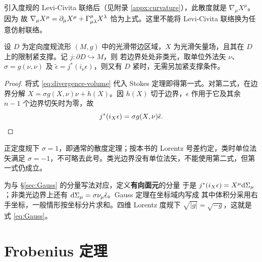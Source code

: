 \begin{remark}
    引入度规的 Levi-Civita 联络后（见附录 \ref{appx:curvature}），此散度就是 $\nabla_\mu X^\mu$。因为
    故 $\nabla_\mu X^\mu=\partial_\mu X^\mu+\Gamma^\mu_{\mu\lambda}X^\lambda$ 恰为上式。这里不能将 Levi-Civita 联络换为任意仿射联络。
\end{remark}

\begin{theorem}[Gauss]
    设 $D$ 为定向度规流形 $(M,g)$ 中的光滑带边区域，$X$ 为光滑矢量场，且其在 $D$ 上的限制紧支撑。记 $j:\partial D\hookrightarrow M$，则
    若边界处处非类光，取单位外法矢 $\nu$、$\sigma=g(\nu,\nu)$ 及 $\tilde\epsilon=j^*(i_\nu\epsilon)$，则又有
    $D$ 紧时，无需另加紧支撑条件。
\end{theorem}
\begin{proof}
    将式 \eqref{eq:divergence-volume} 代入 Stokes 定理即得第一式。对第二式，在边界分解 $X=\sigma g(X,\nu)\nu+h(X)$。因 $h(X)$ 切于边界，$\epsilon$ 作用于它及其余 $n-1$ 个边界切矢时为零，故
    \[j^*(i_X\epsilon)=\sigma g(X,\nu)\tilde\epsilon.\qedhere\]
\end{proof}

\begin{remark}
    正定度规下 $\sigma=1$，即通常的散度定理；按本书的 Lorentz 号差约定，类时单位法矢满足 $\sigma=-1$，不可略去此号。类光边界没有单位法矢，不能使用第二式，但第一式仍成立。
\end{remark}

为与 \S\ref{sec:Gauss} 的分量写法对应，定义\textbf{有向面元}的分量
于是 $j^*(i_X\epsilon)=X^\mu\dd\Sigma_\mu$；非类光边界上还有 $\dd\Sigma_\mu=\sigma\nu_\mu\tilde\epsilon$。Gauss 定理在坐标域内写成
其中体积分采用右手坐标，一般情形按坐标分片求和。四维 Lorentz 度规下 $\sqrt{|g|}=\sqrt{-g}$，这就是式 \eqref{eq:Gauss}。

\section{Frobenius 定理}\label{sec:Frobenius}

